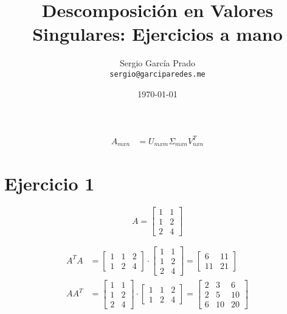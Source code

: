 \documentclass[a4paper, spanish]{article}
\title{Descomposición en Valores Singulares: Ejercicios a mano}
\author{Sergio García Prado \\ \texttt{sergio@garciparedes.me}}
\date{\today}
\begin{document}
  \maketitle

  \begin{align}
    A_{mxn} &= U_{mxm} \Sigma_{mxn} V_{nxn}^T
  \end{align}

  \section{Ejercicio 1}

  \begin{equation}
    A =
    \begin{bmatrix}
      1 & 1\\
      1 & 2\\
      2 & 4
    \end{bmatrix}
  \end{equation}

  \begin{align}
    A^T A &=
    \begin{bmatrix}
      1 & 1 & 2\\
      1 & 2 & 4
    \end{bmatrix}
    \cdot
    \begin{bmatrix}
      1 & 1\\
      1 & 2\\
      2 & 4
    \end{bmatrix}
    =
    \begin{bmatrix}
      6 & 11\\
      11 & 21
    \end{bmatrix} \\
    A A^T &=
    \begin{bmatrix}
      1 & 1\\
      1 & 2\\
      2 & 4
    \end{bmatrix}
    \cdot
    \begin{bmatrix}
      1 & 1 & 2\\
      1 & 2 & 4
    \end{bmatrix}
    =
    \begin{bmatrix}
      2 & 3 & 6 \\
      2 & 5 & 10 \\
      6 & 10 & 20
    \end{bmatrix} \\
  \end{align}
\end{document}
